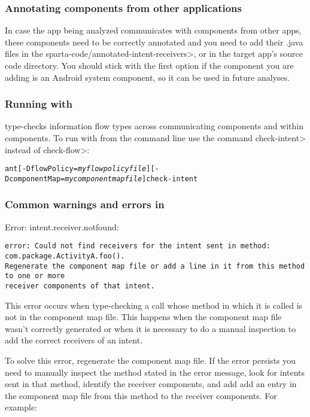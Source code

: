\subsubsection{Annotating components from other applications}
In case the app being analyzed communicates with components from
other apps, these components need to be correctly annotated and you need to add
their .java files in the \<sparta-code/annotated-intent-receivers>, or in the
target app's source code directory. You should stick with the first option if the
component you are adding is an Android system component, so it can be used in
future analyses.

\subsubsection{Running \theIntentChecker{} with \theFlowChecker{}}

\TheIntentChecker{} type-checks information flow types across communicating
components and within components. To run \theIntentChecker{} with
\theFlowChecker{} from the command line use the command \<check-intent> instead
of \<check-flow>:

\begin{alltt}
    ant [-DflowPolicy=\textit{myflowpolicyfile}] [-DcomponentMap=\textit{mycomponentmapfile}] check-intent
\end{alltt}

\subsubsection{Common warnings and errors in \theIntentChecker{}}
\noindent
Error: intent.receiver.notfound:

\begin{Verbatim}
error: Could not find receivers for the intent sent in method: com.package.ActivityA.foo().
Regenerate the component map file or add a line in it from this method to one or more
receiver components of that intent.
\end{Verbatim}

This error occurs when type-checking a \sendIntent{} call whose method in which
it is called is not in the component map file. This happens when the component
map file wasn't correctly generated or when it is necessary to do a manual
inspection to add the correct receivers of an intent.

To solve this error, regenerate the component map file. If the error
persists you need to manually inspect the method stated in the error message,
look for intents sent in that method, identify the receiver components, and add
add an entry in the component map file from this method to the receiver
components. For example:

